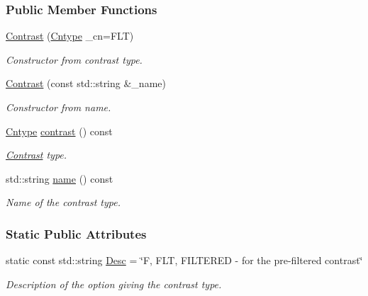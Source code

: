 \subsubsection*{Public Member Functions}
\begin{DoxyCompactItemize}
\item 
\hyperlink{classContrast_a2557eaac83e602a33b25cd9a6eaf991d}{Contrast} (\hyperlink{classContrast_a99b7c9b3f4f10b92a6db24002adac72f}{Cntype} \_\-cn=FLT)
\begin{DoxyCompactList}\small\item\em Constructor from contrast type. \item\end{DoxyCompactList}\item 
\hyperlink{classContrast_a4e55b92f5b8edb836df5eb8dca5a19e2}{Contrast} (const std::string \&\_\-name)
\begin{DoxyCompactList}\small\item\em Constructor from name. \item\end{DoxyCompactList}\item 
\hyperlink{classContrast_a99b7c9b3f4f10b92a6db24002adac72f}{Cntype} \hyperlink{classContrast_a3dd81835c0b2b465c9ca1f70cf531808}{contrast} () const 
\begin{DoxyCompactList}\small\item\em \hyperlink{classContrast}{Contrast} type. \item\end{DoxyCompactList}\item 
std::string \hyperlink{classContrast_a759690bfe7dbf3ef5b416ceb6767183f}{name} () const 
\begin{DoxyCompactList}\small\item\em Name of the contrast type. \item\end{DoxyCompactList}\end{DoxyCompactItemize}
\subsubsection*{Static Public Attributes}
\begin{DoxyCompactItemize}
\item 
static const std::string \hyperlink{classContrast_add7b49ae6e98cb290c7d1df3eefc6330}{Desc} = \char`\"{}F, FLT, FILTERED -\/ for the pre-\/filtered contrast\char`\"{}
\begin{DoxyCompactList}\small\item\em Description of the option giving the contrast type. \item\end{DoxyCompactList}\end{DoxyCompactItemize}

